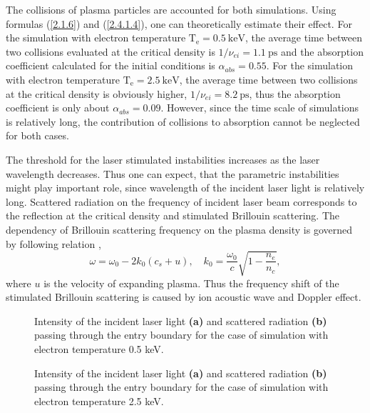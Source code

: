The collisions of plasma particles are accounted for both simulations. Using formulas (\ref{2.1.6}) and (\ref{2.4.1.4}), one can theoretically estimate their effect. For the simulation with electron temperature $ \mathrm{T_e} = 0.5 \: \mathrm{keV} $, the average time between two collisions evaluated at the critical density is $ 1/\nu_{ei} = 1.1 \: \mathrm{ps} $ and the absorption coefficient calculated for the initial conditions is $ \alpha_{abs} = 0.55 $. For the simulation with electron temperature $ \mathrm{T_e} = 2.5 \: \mathrm{keV} $, the average time between two collisions at the critical density is obviously higher, $ 1/\nu_{ei} = 8.2 \: \mathrm{ps} $, thus the absorption coefficient is only about $ \alpha_{abs} = 0.09 $. However, since the time scale of simulations is relatively long, the contribution of collisions to absorption cannot be neglected for both cases.

The threshold for the laser stimulated instabilities increases as the laser wavelength decreases. Thus one can expect, that the parametric instabilities might play important role, since wavelength of the incident laser light is relatively long. Scattered radiation on the frequency of incident laser beam corresponds to the reflection at the critical density and stimulated Brillouin scattering. The dependency of Brillouin scattering frequency on the plasma density is governed by following relation \cite{klimo3},
\begin{equation}
	\omega = \omega_0 - 2 k_0 (c_s + u), \quad k_0 = \frac{\omega_0}{c} \sqrt{1 - \frac{n_e}{n_c}},
\end{equation}
where $ u $ is the velocity of expanding plasma. Thus the frequency shift of the stimulated Brillouin scattering is caused by ion acoustic wave and Doppler effect.

\begin{figure}[h!]%
	\centering
	\caption{Intensity of the incident laser light \textbf{(a)} and scattered radiation \textbf{(b)} passing through the entry boundary for the case of simulation with electron temperature 0.5 keV.}%
	\label{fig:fflux_05kev}%
\end{figure}

\begin{figure}[h!]%
	\centering
	\caption{Intensity of the incident laser light \textbf{(a)} and scattered radiation \textbf{(b)} passing through the entry boundary for the case of simulation with electron temperature 2.5 keV.}%
	\label{fig:fflux_25kev}%
\end{figure}

